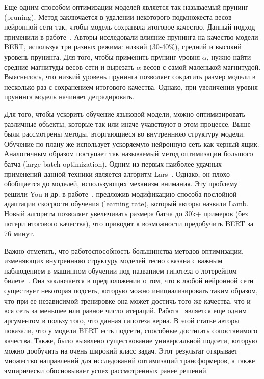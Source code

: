 \documentclass{spbau-diploma}
\begin{document}
Еще одним способом оптимизации моделей является так называемый прунинг (pruning). Метод заключается в удалении некоторого подмножеста весов нейронной сети так, чтобы модель сохраняла итоговое качество. Данный подход применили в работе~\cite{gordon2020compressing}. Авторы исследовали влияние прунинга на качество модели BERT, используя три разных режима: низкий (30-40\%), средний и высокий уровень прунинга. Для того, чтобы применить прунинг уровня $\alpha$, нужно найти средние магнитуды весов сети и вырезать $\alpha$ весов с самой маленькой магнитудой. Выяснилось, что низкий уровень прунинга позволяет сократить размер модели в несколько раз с сохранением итогового качества. Однако, при увеличении уровня прунинга модель начинает деградировать.

Для того, чтобы ускорить обучение языковой модели, можно оптимизировать различные объекты, которые так или иначе учавствуют в этом процессе. Выше были рассмотрены методы, вторгающиеся во внутреннюю структуру модели. Обучение по плану же использует ускоряемую нейронную сеть как черный ящик. Аналогичным образом поступает так называемый метод оптимизации большого батча (large batch optimization). Одним из первых наиболее удачных применений данной техники является алгоритм Lars~\cite{you2017scaling}. Однако, он плохо обобщается до моделей, использующих механизм внимания. Эту проблему решили You и др. в работе~\cite{you2019large}, предложив модификацию способа послойной адаптации скосрости обучения (learning rate), который авторы назвали Lamb. Новый алгоритм позволяет увеличивать размера батча до 30k+ примеров (без потери итогового качества), что приводит к возможности предобучить BERT за 76 минут.

Важно отметить, что работоспособность большинства методов оптимизации, изменяющих внутреннюю структуру моделей тесно связана с важным наблюдением в машинном обучении под названием гипотеза о лотерейном билете~\cite{frankle2018lottery}. Она заключается в предположении о том, что в любой нейронной сети существует некоторая подсеть, которую можно инициализировать таким образом, что при ее независимой тренировке она может достичь того же качества, что и вся сеть за меньшее или равное число итераций. Работа~\cite{chen2020lottery} является еще одним аргументом в пользу того, что данная гипотеза верна. В этой статье авторы показали, что у модели BERT есть подсети, способные достигать сопоставимого качества. Также, было выявлено существование универсальной подсети, которую можно дообучить на очень широкий класс задач. Этот результат открывает множество направлений для исследований оптимизаций трансформеров, а также эмпирически обосновывает успех рассмотренных ранее решений.
\end{document}
